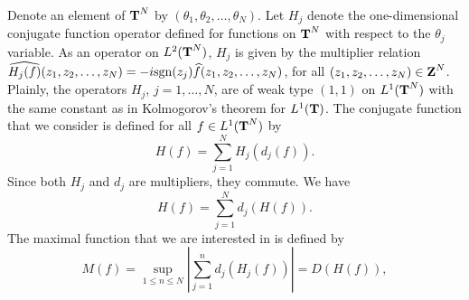 Denote an element of $\T^N$ by $(\theta_1,\theta_2,\ldots,\theta_N)$.
Let $H_j$ denote the one-dimensional conjugate function
operator defined for functions on $\T^N$ with respect to the
$\theta_j$ variable.  As an operator on $L^2(\T^N)$,
$H_j$ is given by the multiplier relation
$\widehat{H_j(f)}(z_1,z_2,\ldots,z_N)=
-i{\rm sgn}(z_j)\widehat{f}(z_1,z_2,\ldots,z_N)$,
for all $(z_1,z_2,\ldots,z_N)\in \Z^N$.
Plainly, the operators $H_j$, $j=1,\ldots,N$, are
of weak type $(1,1)$ on $L^1(\T^N)$ with the same constant
as in Kolmogorov's theorem for $L^1(\T)$.
The conjugate function that we consider is defined 
for all 
$f\in L^1(\T^N)$ by
\begin{equation}
H(f)=\sum_{j=1}^N H_j(d_j(f)).
\label{conj-function}
\end{equation}
Since both $H_j$ and $d_j$ are multipliers, they commute.
We have
\begin{equation}
H(f)=\sum_{j=1}^N d_j(H(f)).
\label{conj-mart-dif}
\end{equation}
The maximal function that we are interested in is defined by
\begin{equation}
M(f)=\sup_{1\leq n\leq N}
\left|
\sum_{j=1}^n d_j(H_j(f))
\right|
=D(H(f)),
\label{max-conj-ft}
\end{equation}
